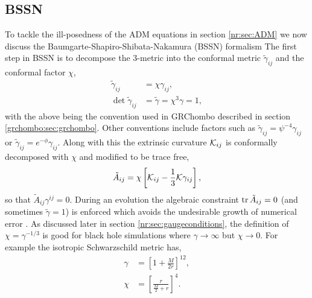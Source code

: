 \subsection{BSSN} \label{nr:sec:bssn}
To tackle the ill-posedness of the ADM equations in section \ref{nr:sec:ADM} we
now discuss the Baumgarte-Shapiro-Shibata-Nakamura (BSSN) formalism \cite{Baumgarte:1998te}
The first step in BSSN is to decompose the 3-metric into the conformal metric
$\tilde{\gamma}_{ij}$ and the conformal factor $\chi$,
\begin{align}
\tilde{\gamma}_{ij} &= \chi \gamma_{ij},\\
 \det{\tilde{\gamma}_{ij}} &= \tilde{\gamma} = \chi^3\gamma = 1,
\end{align}
with the above being the convention used in {\sc GRChombo} described in section
\ref{grchombo:sec:grchombo}. Other conventions include factors such as
$\tilde{\gamma}_{ij} = \psi^{-4}\gamma_{ij}$ or $\tilde{\gamma}_{ij} =e^{-\phi}\gamma_{ij}$.
Along with this the extrinsic curvature $\mathcal{K}_{ij}$ is conformally decomposed with
$\chi$ and modified to be trace free,
\begin{equation}
\tilde{A}_{ij} = \chi\left[ \mathcal{K}_{ij}-\frac{1}{3}\mathcal{K}\gamma_{ij}\right],
 \end{equation}
 so that $\tilde{A}_{ij}\gamma^{ij}=0$.
During an evolution the algebraic constraint $\trace{\tilde{A}_{ij}=0}$ (and sometimes
$\tilde{\gamma}=1$) is enforced which avoids the undesirable growth of numerical error
\cite{Gundlach:2006tw,Cao:2011fu}.
As discussed later in
section \ref{nr:sec:gaugeconditions}, the definition of $\chi = \gamma^{-1/3}$
is good for black hole simulations where $\gamma\rightarrow\infty$ but $\chi
\rightarrow 0$. For example the isotropic Schwarzschild metric has,
\begin{align}
\gamma &= \left[ 1+ \frac{M}{2r}\right]^{12},\\
\chi &=\left[ \frac{r}{\frac{M}{2} + r}\right]^4.
\end{align}

